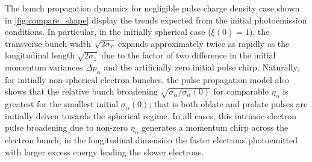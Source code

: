 The bunch propagation dynamics for negligible pulse charge density case shown in \ref{fig:compare_shape} display the trends expected from the initial photoemission conditions.
In particular, in the initially spherical case ($ \xi(0) = 1 $), the transverse bunch width $ \sqrt{2 \sigma_{{\scriptscriptstyle T}}} $ expands approximately twice as rapidly as the longitudinal length $ \sqrt{2 \sigma_{z}} $ due to the factor of two difference in the initial momentum variances $ \Delta p_{\alpha} $ and the artificially zero initial pulse chirp.
Naturally, for initially non-spherical electron bunches, the pulse propagation model also shows that the relative bunch broadening $ \sqrt{ \sigma_{\alpha} / \sigma_{\alpha} (0) } $ for comparable $ \eta_{\alpha} $ is greatest for the smallest initial $ \sigma_{\alpha} (0) $; that is both oblate and prolate pulses are initially driven towards the spherical regime.
In all cases, this intrinsic electron pulse broadening due to non-zero $ \eta_{\alpha} $ generates a momentum chirp across the electron bunch; in the longitudinal dimension the faster electrons photoemitted with larger excess energy leading the slower electrons.

